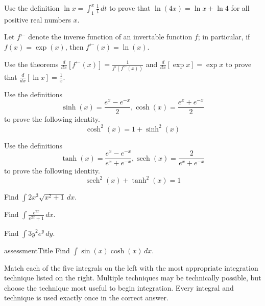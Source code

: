 \documentclass[12pt]{article}
\newcommand{\sech}{\operatorname{sech}}
\begin{document}
Use the definition \(\ln x = \int_1^x \frac{1}{t}\,dt\) to prove that
\(\ln(4x)=\ln x + \ln 4\) for all positive real numbers \(x\).


Let \(f^\leftarrow\) denote the inverse function of an invertable function
\(f\); in particular, if \(f(x)=\exp(x)\), then \(f^\leftarrow(x)=\ln(x)\).

Use the theorems
\(\frac{d}{dx}[f^\leftarrow(x)]=\frac{1}{f'(f^\leftarrow(x))}\) and
\(\frac{d}{dx}[\exp x]=\exp x\) to prove that
\(\frac{d}{dx}[\ln x]=\frac{1}{x}\).





Use the definitions
\[
  \sinh(x) = \frac{e^x-e^{-x}}{2},
  \cosh(x) = \frac{e^x+e^{-x}}{2}
\]
to prove the following identity.
\[
  \cosh^2(x) = 1+\sinh^2(x)
\]





Use the definitions
\[
  \tanh(x) = \frac{e^x-e^{-x}}{e^x+e^{-x}},
  \sech(x) = \frac{2}{e^x+e^{-x}}
\]
to prove the following identity.
\[
  \sech^2(x)+\tanh^2(x)=1
\]




Find \(\displaystyle\int 2x^3\sqrt{x^2+1}\,dx\).


Find \(\displaystyle\int \frac{e^{2x}}{e^{2x}+1}\,dx\).


\newpage






Find \(\int 3y^2e^y\,dy\).

assessmentTitle
Find \(\int \sin(x)\cosh(x)\,dx\).





Match each of the five integrals on the left with
the most appropriate integration technique listed on the right.
Multiple techniques may be technically possible, but choose the technique most
useful to begin integration. Every integral and technique is used exactly
once in the correct answer.
\end{document}
